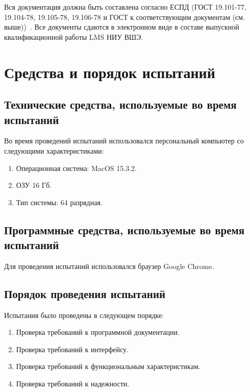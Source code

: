 \documentclass[a4paper,12pt,reqno]{article}
\begin{document}
    \indent
    Вся документация должна быть составлена согласно ЕСПД (ГОСТ 19.101-77, 19.104-78, 19.105-78, 19.106-78 и ГОСТ к соответствующим документам (см. выше))~\cite{TZ:gost0, TZ:gost1, TZ:gost2, TZ:gost3, TZ:gost4, TZ:gost5, TZ:gost6, TZ:gost7, TZ:gost8, TZ:gost9, TZ:gost10, TZ:gost11}. Все документы сдаются в электронном виде в составе выпускной квалификационной работы LMS НИУ ВШЭ.

    \newpage

    \section{Средства и порядок испытаний}

    \subsection{Технические средства, используемые во время испытаний}
    Во время проведений испытаний использовался персональный компьютер со следующими характеристиками:
    \begin{enumerate}
        \item Операционная система: MacOS 15.3.2.
        \item ОЗУ 16 Гб.
        \item Тип системы: 64 разрядная.
    \end{enumerate}

    \subsection{Программные средства, используемые во время испытаний}
    Для проведения испытаний использовался браузер Google Chrome.

    \subsection{Порядок проведения испытаний}
    Испытания было проведены в следующем порядке:
    \begin{enumerate}
        \item Проверка требований к программной документации.
        \item Проверка требований к интерфейсу.
        \item Проверка требований к функциональным характеристикам.
        \item Проверка требований к надежности.
    \end{enumerate}
\end{document}
